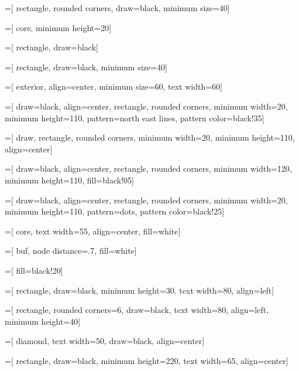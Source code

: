\usepackage{siunitx}
\usepackage{listings}
\usepackage{tikz}
\usetikzlibrary{arrows,babel,backgrounds,fit,patterns,petri,positioning,shapes}

=[
	rectangle,
	rounded corners,
	draw=black,
	minimum size=40]

=[
	core,
	minimum height=20]

=[
	rectangle,
	draw=black]

=[
	rectangle,
	draw=black,
	minimum size=40]

=[
	exterior,
	align=center,
	minimum size=60,
	text width=60]

=[
	draw=black,
	align=center,
	rectangle,
	rounded corners,
	minimum width=20,
	minimum height=110,
	pattern=north east lines,
	pattern color=black!35]

=[
	draw,
	rectangle,
	rounded corners,
	minimum width=20,
	minimum height=110,
	align=center]

=[
	draw=black,
	align=center,
	rectangle,
	rounded corners,
	minimum width=120,
	minimum height=110,
	fill=black!05]

=[
	draw=black,
	align=center,
	rectangle,
	rounded corners,
	minimum width=20,
	minimum height=110,
	pattern=dots,
	pattern color=black!25]

=[
	core,
	text width=55,
	align=center,
	fill=white]
	
=[
	buf,
	node distance=.7,
	fill=white]
	
=[
	fill=black!20]

=[
	rectangle,
	draw=black,
	minimum height=30,
	text width=80,
	align=left]
	
=[
	rectangle,
	rounded corners=6,
	draw=black,
	text width=80,
	align=left,
	minimum height=40]

=[
	diamond,
	text width=50,
	draw=black,
	align=center]
	
=[
	rectangle,
	draw=black,
	minimum height=220,
	text width=65,
	align=center]

\newcommand{\epg}[3]{
	Buffer {#1}\\
	[44pt]EP{#2}\\
	[44pt]{#3} Bytes}

\newcommand{\ep}[3]{
	Buffer {#1}\\
	[8pt]EP{#2}\\
	[8pt]{#3} Bytes}

\newcommand{\newwave}[1]{
	\path (0,\value{wavecount}) node[text width=45,anchor=east,align=right]{#1} node[coordinate](t_cur){};
	\draw (0,\value{wavecount}+.3) --++(.2,0);
	\draw (0,\value{wavecount}-.3) --++(.2,0);
	\path (t_cur) --++(.3,0)node[coordinate](t_cur){};
	\addtocounter{wavecount}{-1}}

\newcommand*{\bit}[2]{
	\draw (t_cur) -- ++(0.1,.6*#1-.3) -- ++(#2-.2,0) -- ++(+.1,.3-.6*#1)
	node[coordinate] (t_cur) {};}


\graphicspath{{../img/}}
